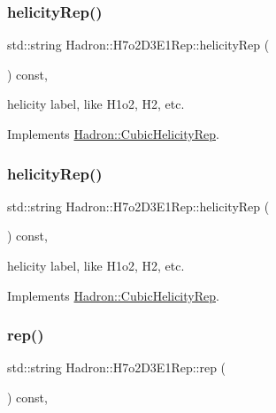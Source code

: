 \subsubsection{\texorpdfstring{helicityRep()}{helicityRep()}\hspace{0.1cm}{\footnotesize\ttfamily [2/3]}}
{\footnotesize\ttfamily std\+::string Hadron\+::\+H7o2\+D3\+E1\+Rep\+::helicity\+Rep (\begin{DoxyParamCaption}{ }\end{DoxyParamCaption}) const\hspace{0.3cm}{\ttfamily [inline]}, {\ttfamily [virtual]}}

helicity label, like H1o2, H2, etc. 

Implements \mbox{\hyperlink{structHadron_1_1CubicHelicityRep_af1096946b7470edf0a55451cc662f231}{Hadron\+::\+Cubic\+Helicity\+Rep}}.

\mbox{\label{structHadron_1_1H7o2D3E1Rep_a3e5ff6ed7ad90eeab64132f0434cdde5}} 
\subsubsection{\texorpdfstring{helicityRep()}{helicityRep()}\hspace{0.1cm}{\footnotesize\ttfamily [3/3]}}
{\footnotesize\ttfamily std\+::string Hadron\+::\+H7o2\+D3\+E1\+Rep\+::helicity\+Rep (\begin{DoxyParamCaption}{ }\end{DoxyParamCaption}) const\hspace{0.3cm}{\ttfamily [inline]}, {\ttfamily [virtual]}}

helicity label, like H1o2, H2, etc. 

Implements \mbox{\hyperlink{structHadron_1_1CubicHelicityRep_af1096946b7470edf0a55451cc662f231}{Hadron\+::\+Cubic\+Helicity\+Rep}}.

\mbox{\label{structHadron_1_1H7o2D3E1Rep_a9b7fbb0d47650cdab86b3bb9832bbe75}} 
\subsubsection{\texorpdfstring{rep()}{rep()}\hspace{0.1cm}{\footnotesize\ttfamily [1/5]}}
{\footnotesize\ttfamily std\+::string Hadron\+::\+H7o2\+D3\+E1\+Rep\+::rep (\begin{DoxyParamCaption}{ }\end{DoxyParamCaption}) const\hspace{0.3cm}{\ttfamily [inline]}, {\ttfamily [virtual]}}



